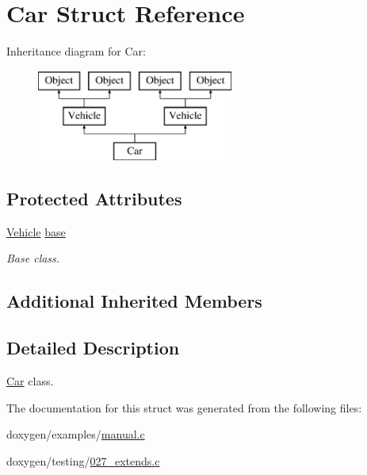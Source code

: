 \hypertarget{struct_car}{}\section{Car Struct Reference}
\label{struct_car}
Inheritance diagram for Car\+:\begin{figure}[H]
\begin{center}
\leavevmode
\includegraphics[height=3.000000cm]{struct_car}
\end{center}
\end{figure}
\subsection*{Protected Attributes}
\begin{DoxyCompactItemize}
\item 
\mbox{\label{struct_car_ab8ff28306286da5a8b14fa9bdccaafaa}} 
\mbox{\hyperlink{struct_vehicle}{Vehicle}} \mbox{\hyperlink{struct_car_ab8ff28306286da5a8b14fa9bdccaafaa}{base}}
\begin{DoxyCompactList}\small\item\em Base class. \end{DoxyCompactList}\end{DoxyCompactItemize}
\subsection*{Additional Inherited Members}


\subsection{Detailed Description}
\mbox{\hyperlink{struct_car}{Car}} class. 

The documentation for this struct was generated from the following files\+:\begin{DoxyCompactItemize}
\item 
doxygen/examples/\mbox{\hyperlink{manual_8c}{manual.\+c}}\item 
doxygen/testing/\mbox{\hyperlink{027__extends_8c}{027\+\_\+extends.\+c}}\end{DoxyCompactItemize}
